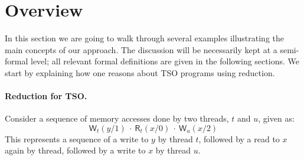 \documentclass[preprint,9pt]{sigplanconf}
\begin{document}
\newcommand{\dontcare}{\ensuremath{\star}}
\newcommand{\genmemaccess}{\ensuremath{\mathsf{M}}}
\newcommand{\genmemaccesstso}{\ensuremath{\genmemaccess_{TSO}}}
\newcommand{\genread}{\ensuremath{\mathsf{R}}}
\newcommand{\aliwrite}{\ensuremath{\mathsf{W}}}
\newcommand{\aliwritex}[3]{\ensuremath{\aliwrite_{#1}(#2/#3)}}
\newcommand{\aliread}{\ensuremath{\mathsf{R}}}
\newcommand{\alireadx}[3]{\ensuremath{\aliread_{#1}(#2/#3)}}
\newcommand{\locwrite}{\ensuremath{\aliwrite^{\mathsf{l}}}}
\newcommand{\locwritex}[3]{\ensuremath{\locwrite_{#1}(#2/#3)}}
\newcommand{\remwrite}{\ensuremath{\aliwrite^{\mathsf{r}}}}
\newcommand{\remwritex}[3]{\ensuremath{\remwrite_{#1}(#2/#3)}}
\newcommand{\alibarrier}{\ensuremath{\mathsf{B}}}
\newcommand{\alibarrierx}[1]{\ensuremath{\alibarrier_{#1}}}
\newcommand{\alilock}{\ensuremath{\mathsf{L}}}
\newcommand{\alilockx}[1]{\ensuremath{\alilock_{#1}}}
\newcommand{\aliunlock}{\ensuremath{\mathsf{U}}}
\newcommand{\aliunlockx}[1]{\ensuremath{\aliunlock_{#1}}}


\newcommand{\alitrue}{\ensuremath{\mathit{true}}}
\newcommand{\alifalse}{\ensuremath{\mathit{false}}}



\section{Overview}
In this section we are going to walk through several examples illustrating the main concepts of our approach.
The discussion will be necessarily kept at a semi-formal level; all relevant formal definitions are given in the following sections.
We start by explaining how one reasons about TSO programs using reduction.

\paragraph{Reduction for TSO.}
Consider a sequence of memory accesses done by two threads, $t$ and $u$, given as:
\[
{\aliwritex t y 1}\ \cdot\ {\alireadx t x 0}\ \cdot\ {\aliwritex u x 2}
\]
This represents a sequence of a write to $y$ by thread $t$, followed by a read to $x$ again by thread, followed by a write to $x$ by thread $u$.
\end{document}
